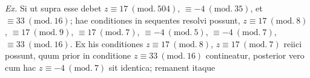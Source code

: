 
\emph{Ex.} Si ut supra esse debet $z\equiv 17\ (\mathrm{mod.}\ 504)$,
$\equiv -4\ (\mathrm{mod.}\ 35)$, et $\equiv 33\ (\mathrm{mod.}\ 16)$; hae conditiones in
sequentes resolvi possunt, $z\equiv 17\ (\mathrm{mod.}\ 8)$, $\equiv 17\ (\mathrm{mod.}\ 9)$,
$\equiv 17\ (\mathrm{mod.}\ 7)$, $\equiv -4\ (\mathrm{mod.}\ 5)$,
$\equiv -4\ (\mathrm{mod.}\ 7)$, $\equiv 33\ (\mathrm{mod.}\ 16)$.
Ex his conditiones $z\equiv 17\ (\mathrm{mod.}\ 8)$, $z\equiv 17\ (\mathrm{mod.}\ 7)$ reiici
possunt, quum prior in conditione $z\equiv 33\ (\mathrm{mod.}\ 16)$ contineatur, posterior
vero cum hac $z\equiv -4\ (\mathrm{mod.}\ 7)$ sit identica; remanent itaque
